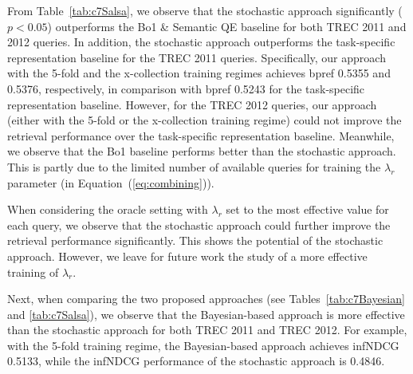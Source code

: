 \documentclass[1p]{elsarticle}
\begin{document}
From Table~\ref{tab:c7Salsa}, we observe that the stochastic approach significantly ($p<0.05$) outperforms the Bo1 \& Semantic QE baseline for both TREC 2011 and 2012 queries. In addition, the stochastic approach
outperforms the task-specific representation baseline for the TREC 2011 queries. Specifically, our approach with the 5-fold and the x-collection training regimes achieves bpref 0.5355 and 0.5376, respectively, in comparison with bpref 0.5243 for the task-specific representation baseline. However, for the TREC 2012 queries, our approach (either with the 5-fold or the x-collection training regime) could not improve the retrieval performance over the task-specific representation baseline. Meanwhile, we observe that the Bo1 baseline performs better than the stochastic approach. This is partly due to the limited number of available queries for training the $\lambda_r$ parameter (in Equation~(\ref{eq:combining})). 

When considering the oracle setting with $\lambda_r$ set to the most effective value for each query, we observe that the stochastic approach could further improve the retrieval performance significantly. This shows the potential of the stochastic approach. However, we leave for future work the study of a more effective training of $\lambda_r$.

Next, when comparing the two proposed approaches (see Tables~\ref{tab:c7Bayesian} and \ref{tab:c7Salsa}), we observe that the Bayesian-based approach is more effective than the stochastic approach for both TREC 2011 and TREC 2012. For example, with the 5-fold training regime, the Bayesian-based approach achieves infNDCG 0.5133, while the infNDCG performance of the stochastic approach is 0.4846.

\end{document}
